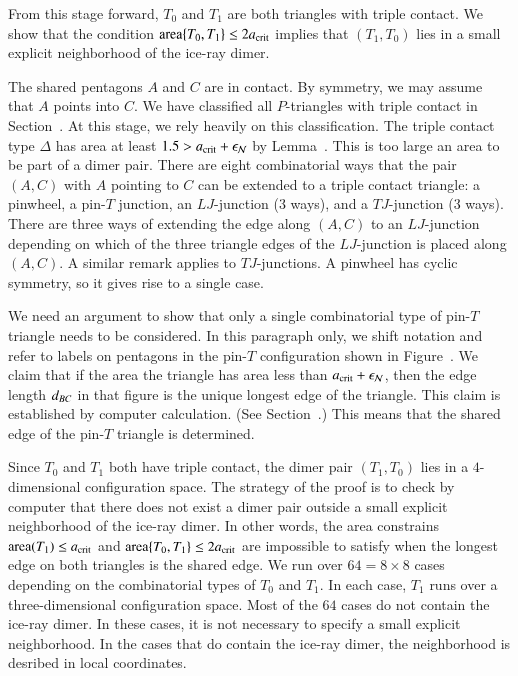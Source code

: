 From this stage forward, $T_0$ and $T_1$ are both triangles with
triple contact.  We show that the condition ${\operatorname{area}}\{T_0,T_1\}\le
2a_\text{crit}$ implies that $(T_1,T_0)$ lies in a small explicit
neighborhood of the ice-ray dimer.

The shared pentagons $A$ and $C$ are in contact.  By symmetry, we may
assume that $A$ points into $C$.  We have classified all $P$-triangles
with triple contact in Section~.  At this stage, we
rely heavily on this classification.  The triple contact type $\Delta$
has area at least $1.5 > a_\text{crit}+\epsilon_{\mathcal N}$ by Lemma~.
This is too large an area to be part of a dimer pair.  There are eight
combinatorial ways that the pair $(A,C)$ with $A$ pointing to $C$ can
be extended to a triple contact triangle: a pinwheel, a pin-$T$
junction, an $LJ$-junction (3 ways), and a $TJ$-junction (3 ways).
There are three ways of extending the edge along $(A,C)$ to an
$LJ$-junction depending on which of the three triangle edges of the
$LJ$-junction is placed along $(A,C)$.  A similar remark applies to
$TJ$-junctions.  A pinwheel has cyclic symmetry, so it gives rise to a
single case.

We need an argument to show that only a single combinatorial type of
pin-$T$ triangle needs to be considered.  In this paragraph only, we
shift notation and refer to labels on pentagons in the pin-$T$
configuration shown in Figure~.  We claim that if
the area the triangle has area less than $a_\text{crit}+\epsilon_{\mathcal N}$, then the edge
length $d_{BC}$ in that figure is the unique longest edge of the
triangle.  This claim is established by computer calculation.  (See
Section~.)  This means that the shared edge of the
pin-$T$ triangle is determined.

Since $T_0$ and $T_1$ both have triple contact, the dimer pair
$(T_1,T_0)$ lies in a $4$-dimensional configuration space.  The
strategy of the proof is to check by computer that there does not
exist a dimer pair outside a small explicit neighborhood of the
ice-ray dimer.  In other words, the area constrains ${\operatorname{area}}(T_1)\le
a_\text{crit}$ and ${\operatorname{area}}\{T_0,T_1\}\le2a_\text{crit}$ are impossible to satisfy
when the longest edge on both triangles is the shared edge.  We run
over $64 = 8\times 8$ cases depending on the combinatorial types of
$T_0$ and $T_1$.  In each case, $T_1$ runs over a three-dimensional
configuration space.  Most of the $64$ cases do not contain the
ice-ray dimer.  In these cases, it is not necessary to specify a small
explicit neighborhood.  In the cases that do contain the ice-ray
dimer, the neighborhood is desribed in local coordinates.

